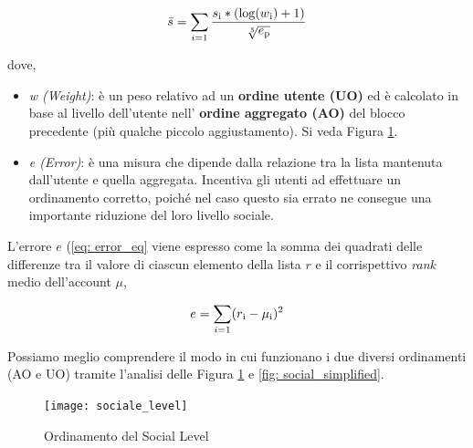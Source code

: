 \begin{equation}\label{eq: social_level_eq}
  \Bar{s} = \sum\limits_{i=1} \frac{s\textsubscript{i}*(\log (w\textsubscript{i}) + 1)}{\sqrt[5]{e\textsubscript{p}}}
\end{equation}

dove,
\begin{itemize}
    \item \textit{w (Weight)}: è un peso relativo ad un \textbf{ordine utente (UO)} ed è calcolato in base al livello dell'utente nell' \textbf{ordine aggregato (AO)} del blocco precedente (più qualche piccolo aggiustamento). Si veda Figura \ref{fig: social_table}.
    \item \textit{e (Error)}: è una misura che dipende dalla relazione tra la lista mantenuta dall'utente e quella aggregata. Incentiva gli utenti ad effettuare un ordinamento corretto, poiché nel caso questo sia errato ne consegue una importante riduzione del loro livello sociale.
\end{itemize}

L'errore $e$ (\ref{eq: error_eq} viene espresso come la somma dei quadrati delle differenze tra il valore di ciascun elemento della lista $r$ e il corrispettivo \textit{rank} medio dell'account $\mu$,

\begin{equation}\label{eq: error_eq}
    e = \sum\limits_{i=1} (r\textsubscript{i} - \mu\textsubscript{i})^2
\end{equation}

Possiamo meglio comprendere il modo in cui funzionano i due diversi ordinamenti (AO e UO) tramite l'analisi delle Figura \ref{fig: social_table} e \ref{fig: social_simplified}.

\begin{figure}[h!]
    \centering
    \texttt{[image: sociale\_level]}
    \caption{Ordinamento del Social Level}
    \label{fig: social_table}
\end{figure}

